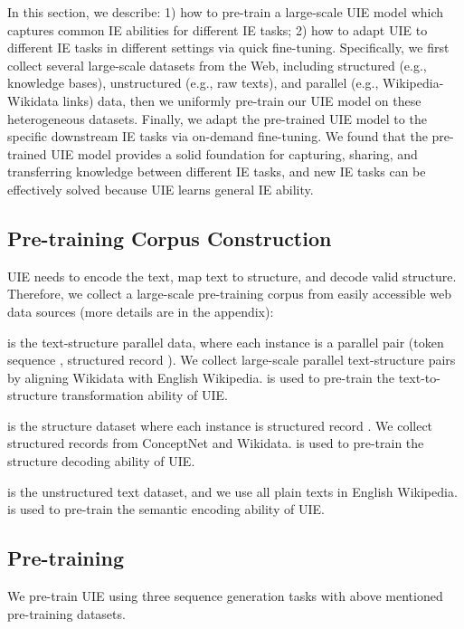 \documentclass[11pt]{article}
\begin{document}
In this section, we describe:
1) how to pre-train a large-scale UIE model which captures common IE abilities for different IE tasks;
2) how to adapt UIE to different IE tasks in different settings via quick fine-tuning.
Specifically, we first collect several large-scale datasets from the Web, including structured (e.g., knowledge bases), unstructured (e.g., raw texts), and parallel (e.g., Wikipedia-Wikidata links) data, then we uniformly pre-train our UIE model on these heterogeneous datasets.
Finally, we adapt the pre-trained UIE model to the specific downstream IE tasks via on-demand fine-tuning.
We found that the pre-trained UIE model provides a solid foundation for capturing, sharing, and transferring knowledge between different IE tasks, and new IE tasks can be effectively solved because UIE learns general IE ability. 

\subsection{Pre-training Corpus Construction}
UIE needs to encode the text, map text to structure, and decode valid structure. 
Therefore, we collect a large-scale pre-training corpus from easily accessible web data sources (more details are in the appendix):

 is the text-structure parallel data, where each instance is a parallel pair (token sequence , structured record ).
We collect large-scale parallel text-structure pairs by aligning Wikidata with English Wikipedia.
 is used to pre-train the text-to-structure transformation ability of UIE.

 is the structure dataset where each instance is structured record .
We collect structured records from ConceptNet \cite{Speer_Chin_Havasi_2017} and Wikidata.
 is used to pre-train the structure decoding ability of UIE.

 is the unstructured text dataset, and we use all plain texts in English Wikipedia.
 is used to pre-train the semantic encoding ability of UIE.

\subsection{Pre-training}
\label{sec:tasks_for_pretraining}

We pre-train UIE using three sequence generation tasks with above mentioned pre-training datasets.
\end{document}
